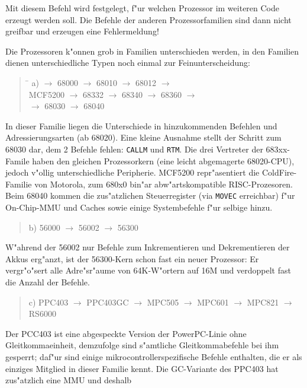 \documentclass[12pt,a4paper,twoside]{report}
\newcommand{\tty}[1]{{\tt #1}}
\begin{document}
Mit diesem Befehl wird festgelegt, f"ur welchen Prozessor im weiteren
Code erzeugt werden soll.  Die Befehle der anderen Prozessorfamilien
sind dann nicht greifbar und erzeugen eine Fehlermeldung!
\par
Die Prozessoren k"onnen grob in Familien unterschieden werden, in den
Familien dienen unterschiedliche Typen noch einmal zur Feinunterscheidung:
\begin{quote}
\begin{tabbing}
\hspace{0.7cm} \= \kill
a)  $\rightarrow$ 68000 $\rightarrow$ 68010 $\rightarrow$ 68012 $\rightarrow$ \\
   \> MCF5200 $\rightarrow$ 68332 $\rightarrow$ 68340 $\rightarrow$ 68360 $\rightarrow$ \\
    $\rightarrow$ 68030 $\rightarrow$ 68040
\end{tabbing}
\end{quote}
In dieser Familie liegen die Unterschiede in hinzukommenden Befehlen
und Adressierungsarten (ab 68020).  Eine kleine Ausnahme stellt der
Schritt zum 68030 dar, dem 2 Befehle fehlen: \tty{CALLM} und \tty{RTM}.
Die drei Vertreter der 683xx-Famile haben den gleichen Prozessorkern (eine
leicht abgemagerte 68020-CPU), jedoch v"ollig unterschiedliche Peripherie.
MCF5200 repr"asentiert die ColdFire-Familie von Motorola, zum 680x0 bin"ar
abw"artskompatible RISC-Prozesoren. Beim 68040 kommen die zus"atzlichen
Steuerregister (via \tty{MOVEC} erreichbar) f"ur On-Chip-MMU und Caches
sowie einige Systembefehle f"ur selbige hinzu.
\begin{quote}
b) 56000 $\longrightarrow$ 56002 $\longrightarrow$ 56300
\end{quote}
W"ahrend der 56002 nur Befehle zum Inkrementieren und Dekrementieren der
Akkus erg"anzt, ist der 56300-Kern schon fast ein neuer Prozessor: Er
vergr"o"sert alle Adre"sr"aume von 64K-W"ortern auf 16M und verdoppelt fast
die Anzahl der Befehle.
\begin{quote}
c) PPC403 $\rightarrow$ PPC403GC $\rightarrow$ MPC505 $\rightarrow$ MPC601 $\rightarrow$ MPC821 $\rightarrow$ RS6000
\end{quote}
Der PCC403 ist eine abgespeckte Version der PowerPC-Linie ohne
Gleitkommaeinheit, demzufolge sind s"amtliche Gleitkommabefehle
bei ihm gesperrt; daf"ur sind einige mikrocontrollerspezifische
Befehle enthalten, die er als einziges Mitglied in dieser Familie
kennt.  Die GC-Variante des PPC403 hat zus"atzlich eine MMU und deshalb
\end{document}
